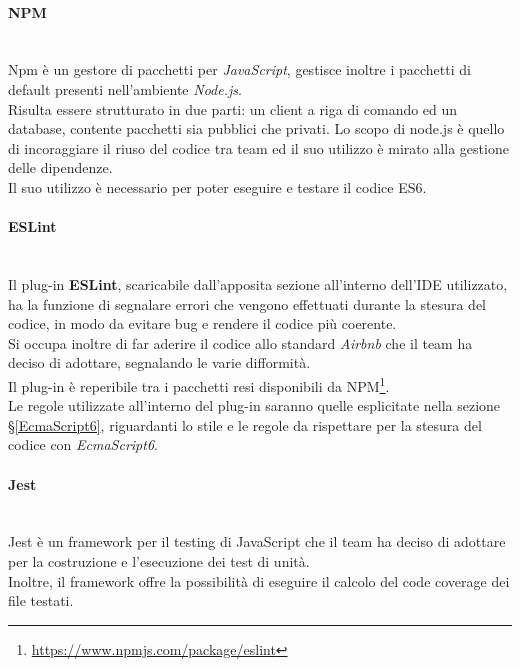 \paragraph{NPM}\-\\\label{NPM}
Npm è un gestore di pacchetti per \textit{JavaScript}, gestisce inoltre i pacchetti di default presenti nell'ambiente \textit{Node.js}.\\
Risulta essere strutturato in due parti: un client a riga di comando ed un database, contente pacchetti sia pubblici che privati. Lo scopo di node.js è quello di incoraggiare il riuso del codice tra team ed il suo utilizzo è mirato alla gestione delle dipendenze.\\ 
Il suo utilizzo è necessario per poter eseguire e testare il codice ES6.

\paragraph{ESLint}\-\\
Il plug-in \textbf{ESLint}, scaricabile dall'apposita sezione all'interno dell'IDE utilizzato, ha la funzione di segnalare errori che vengono effettuati durante la stesura del codice, in modo da evitare bug e rendere il codice più coerente. \\ 
Si occupa inoltre di far aderire il codice allo standard \textit{Airbnb} che il team ha deciso di adottare, segnalando le varie difformità.\\
Il plug-in è reperibile tra i pacchetti resi disponibili da NPM\footnote{\url{https://www.npmjs.com/package/eslint}}.\\
Le regole utilizzate all'interno del plug-in saranno quelle esplicitate nella sezione §\ref{EcmaScript6}, riguardanti lo stile e le regole da rispettare per la stesura del codice con \textit{EcmaScript6}.

\paragraph{Jest}\-\\\label{jest}
Jest è un framework per il testing di JavaScript che il team ha deciso di adottare per la costruzione e l'esecuzione dei test di unità.\\
Inoltre, il framework offre la possibilità di eseguire il calcolo del code coverage dei file testati.




